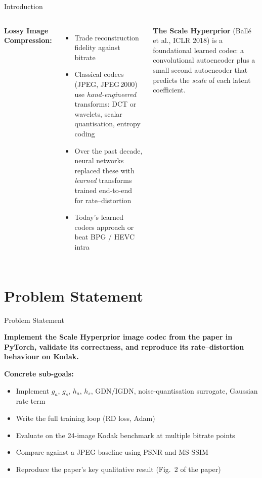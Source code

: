 \documentclass[aspectratio=169, 12pt]{beamer}
\begin{document}
\begin{frame}{Introduction}
    \begin{columns}
        \textbf{Lossy Image Compression:}
        \begin{itemize}
            \item Trade reconstruction fidelity against bitrate
            \item Classical codecs (JPEG, JPEG\,2000) use \emph{hand-engineered} transforms: DCT or wavelets, scalar quantisation, entropy coding
            \item Over the past decade, neural networks replaced these with \emph{learned} transforms trained end-to-end for rate--distortion
            \item Today's learned codecs approach or beat BPG / HEVC intra
        \end{itemize}

        \centering
        \begin{keypoint}
        \textbf{The Scale Hyperprior} (Ball\'e et al., ICLR 2018) is a foundational learned codec: a convolutional autoencoder plus a small second autoencoder that predicts the \emph{scale} of each latent coefficient.
        \end{keypoint}
    \end{columns}
\end{frame}

\section{Problem Statement}

\begin{frame}{Problem Statement}
    \begin{keypoint}
    \textbf{Implement the Scale Hyperprior image codec from the paper in PyTorch, validate its correctness, and reproduce its rate--distortion behaviour on Kodak.}
    \end{keypoint}

    \vspace{0.4cm}
    \textbf{Concrete sub-goals:}
    \begin{itemize}
        \setlength\itemsep{0.7em}
        \item Implement $g_a$, $g_s$, $h_a$, $h_s$, GDN/IGDN, noise-quantisation surrogate, Gaussian rate term
        \item Write the full training loop (RD loss, Adam)
        \item Evaluate on the 24-image Kodak benchmark at multiple bitrate points
        \item Compare against a JPEG baseline using PSNR and MS-SSIM
        \item Reproduce the paper's key qualitative result (Fig.\ 2 of the paper)
    \end{itemize}
\end{frame}
\end{document}
